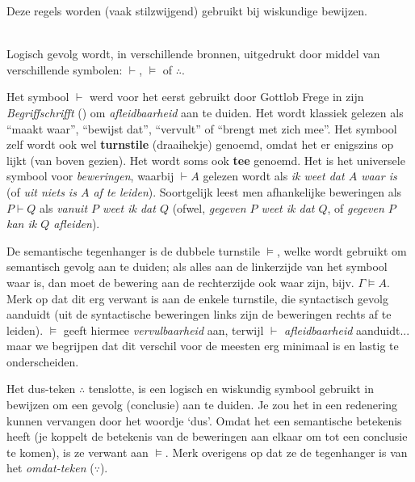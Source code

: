 Deze regels worden (vaak stilzwijgend) gebruikt bij wiskundige bewijzen.

\begin{aside}\mbox{}\\
Logisch gevolg wordt, in verschillende bronnen, uitgedrukt door middel van verschillende symbolen: $\vdash$, $\vDash$ of $\therefore$.

Het symbool $\vdash$ werd voor het eerst gebruikt door Gottlob Frege in zijn \textit{Begriffschrifft} (\citeyear{frege:begriffschrift}) om \textit{afleidbaarheid} aan te duiden. Het wordt klassiek gelezen als \enquote{maakt waar}, \enquote{bewijst dat}, \enquote{vervult} of \enquote{brengt met zich mee}. Het symbool zelf wordt ook wel \textbf{turnstile} (draaihekje) genoemd, omdat het er enigszins op lijkt (van boven gezien). Het wordt soms ook \textbf{tee} genoemd. Het is het universele symbool voor \textit{beweringen}, waarbij $\vdash A$ gelezen wordt als \textit{ik weet dat $A$ waar is} (of \textit{uit niets is $A$ af te leiden}). Soortgelijk leest men afhankelijke beweringen als $P\vdash Q$ als \textit{vanuit $P$ weet ik dat $Q$} (ofwel, \textit{gegeven $P$ weet ik dat $Q$}, of \textit{gegeven $P$ kan ik $Q$ afleiden}).

De semantische tegenhanger is de dubbele turnstile $\vDash$, welke wordt gebruikt om semantisch gevolg aan te duiden; als alles aan de linkerzijde van het symbool waar is, dan moet de bewering aan de rechterzijde ook waar zijn, bijv. $\Gamma\vDash A$. Merk op dat dit erg verwant is aan de enkele turnstile, die syntactisch gevolg aanduidt (uit de syntactische beweringen links zijn de beweringen rechts af te leiden). $\vDash$ geeft hiermee \textit{vervulbaarheid} aan, terwijl $\vdash$ \textit{afleidbaarheid} aanduidt... maar we begrijpen dat dit verschil voor de meesten erg minimaal is en lastig te onderscheiden.

Het dus-teken $\therefore$ tenslotte, is een logisch en wiskundig symbool gebruikt in bewijzen om een gevolg (conclusie) aan te duiden. Je zou het in een redenering kunnen vervangen door het woordje `dus'. Omdat het een semantische betekenis heeft (je koppelt de betekenis van de beweringen aan elkaar om tot een conclusie te komen), is ze verwant aan $\vDash$. Merk overigens op dat ze de tegenhanger is van het \textit{omdat-teken} ($\because$).
\end{aside}

